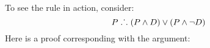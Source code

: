 %
%
%
%
%

To see the rule in action, consider:
$$P \mathrel{\ldotp\dot{}\,\ldotp} (P \wedge D) \vee (P \wedge \neg D)$$
Here is a proof corresponding with the argument:
\begin{pf}
	\LEM
	\open
	\close
	\open
	\close
\end{pf}

